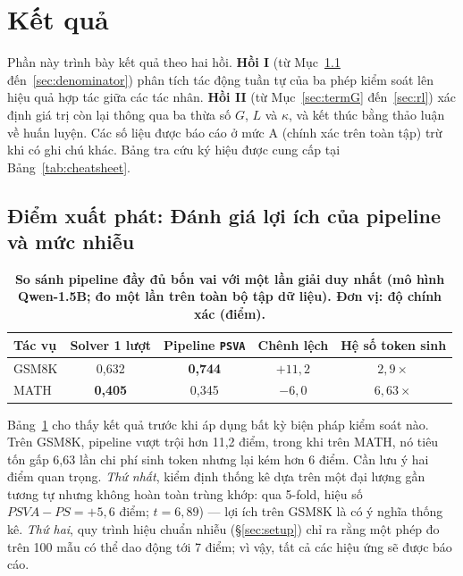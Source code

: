 \documentclass[12pt,a4paper]{article}
\begin{document}
\section{Kết quả}\label{sec:results}

Phần này trình bày kết quả theo hai hồi. \textbf{Hồi I} (từ Mục~\ref{sec:start} đến~\ref{sec:denominator}) phân tích tác động tuần tự của ba phép kiểm soát lên hiệu quả hợp tác giữa các tác nhân. \textbf{Hồi II} (từ Mục~\ref{sec:termG} đến~\ref{sec:rl}) xác định giá trị còn lại thông qua ba thừa số \(G\), \(L\) và \(\kappa\), và kết thúc bằng thảo luận về huấn luyện. Các số liệu được báo cáo ở mức A (chính xác trên toàn tập) trừ khi có ghi chú khác. Bảng tra cứu ký hiệu được cung cấp tại Bảng~\ref{tab:cheatsheet}.

\subsection{Điểm xuất phát: Đánh giá lợi ích của pipeline và mức nhiễu}\label{sec:start}

\begin{table}[h]\centering\small
\begin{tabular}{@{}l c c c c@{}}
\toprule
Tác vụ & Solver 1 lượt & Pipeline \texttt{PSVA} & Chênh lệch & Hệ số token sinh\\
\midrule
GSM8K & 0,632 & \textbf{0,744} & \(+11{,}2\) & \(2{,}9\times\)\\
MATH  & \textbf{0,405} & 0,345 & \(-6{,}0\) & \(6{,}63\times\)\\
\bottomrule
\end{tabular}
\caption{\textbf{So sánh pipeline đầy đủ bốn vai với một lần giải duy nhất (mô hình Qwen-1.5B; đo một lần trên toàn bộ tập dữ liệu). Đơn vị: độ chính xác (điểm).}}
\label{tab:pipeline}
\end{table}

Bảng~\ref{tab:pipeline} cho thấy kết quả trước khi áp dụng bất kỳ biện pháp kiểm soát nào. Trên GSM8K, pipeline vượt trội hơn 11,2 điểm, trong khi trên MATH, nó tiêu tốn gấp 6,63 lần chi phí sinh token nhưng lại kém hơn 6 điểm. Cần lưu ý hai điểm quan trọng. \textit{Thứ nhất}, kiểm định thống kê dựa trên một đại lượng gần tương tự nhưng không hoàn toàn trùng khớp: qua 5-fold, hiệu số \(\textit{PSVA}-\textit{PS} = +5{,}6\) điểm; \(t=6{,}89\)) --- lợi ích trên GSM8K là có ý nghĩa thống kê. \textit{Thứ hai}, quy trình hiệu chuẩn nhiễu (\S\ref{sec:setup}) chỉ ra rằng một phép đo trên 100 mẫu có thể dao động tới 7 điểm; vì vậy, tất cả các hiệu ứng sẽ được báo cáo.
\end{document}
